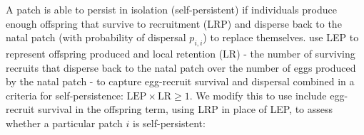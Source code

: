 \documentclass[12pt, oneside]{article}   	%
\begin{document}
A patch is able to persist in isolation (self-persistent) if individuals produce enough offspring that survive to recruitment (LRP) and disperse back to the natal patch (with probability of dispersal $p_{i,i}$) to replace themselves. \cite{burgess2014beyond} use LEP to represent offspring produced and local retention (LR) - the number of surviving recruits that disperse back to the natal patch over the number of eggs produced by the natal patch - to capture egg-recruit survival and dispersal combined in a criteria for self-persistence: $\text{LEP} \times \text{LR} \geq 1$. We modify this to use include egg-recruit survival in the offspring term, using LRP in place of LEP, to assess whether a particular patch $i$ is self-persistent:
\end{document}
